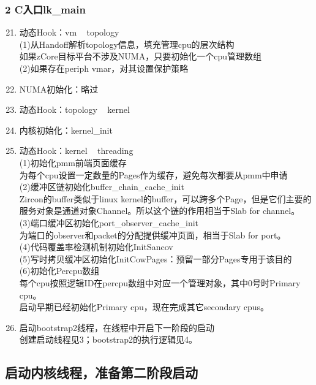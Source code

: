 \documentclass[
8pt, %
]{beamer}
\begin{document}
	\begin{frame}
		\frametitle{2 C入口lk\_main}
		\begin{enumerate}\setcounter{enumi}{20}
			\item 动态Hook：vm ~ topology\\
			(1)从Handoff解析topology信息，填充管理cpu的层次结构\\
			如果zCore目标平台不涉及NUMA，只要初始化一个cpu管理数组\\
			(2)如果存在periph vmar，对其设置保护策略\\
			\item NUMA初始化：略过
			\item 动态Hook：topology ~ kernel
			\item 内核初始化：kernel\_init
			\item 动态Hook：kernel ~ threading\\
			(1)初始化pmm前端页面缓存\\
			为每个cpu设置一定数量的Pages作为缓存，避免每次都要从pmm中申请\\
			(2)缓冲区链初始化buffer\_chain\_cache\_init\\
			Zircon的buffer类似于linux kernel的buffer，可以跨多个Page，但是它们主要的服务对象是通道对象Channel。所以这个链的作用相当于Slab for channel。\\
			(3)端口缓冲区初始化port\_observer\_cache\_init\\
			为端口的observer和packet的分配提供缓冲页面，相当于Slab for port。\\
			(4)代码覆盖率检测机制初始化InitSancov\\
			(5)写时拷贝缓冲区初始化InitCowPages：预留一部分Pages专用于该目的\\
			(6)初始化Percpu数组\\
			每个cpu按照逻辑ID在percpu数组中对应一个管理对象，其中0号时Primary cpu。\\
			启动早期已经初始化Primary cpu，现在完成其它secondary cpus。
			\item 启动bootstrap2线程，在线程中开启下一阶段的启动\\
			创建启动线程见3；bootstrap2的执行逻辑见4。
		\end{enumerate}
	\end{frame}

	\subsection{启动内核线程，准备第二阶段启动}
\end{document}
